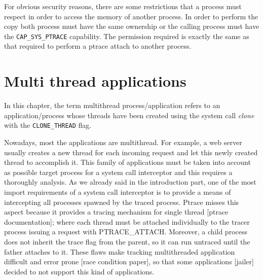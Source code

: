 For obvious security reasons, there are some restrictions that a process must respect in order to access the memory of another process. In order to perform the copy both process must have the same ownership or the calling process must have the \lstinline$CAP_SYS_PTRACE$ capability. The permission required is exactly the same as that required to perform a ptrace attach to another process. 






\section{Multi thread applications}
\label{multi_thread_application}

 In this chapter, the term multithread process/application refers to an application/process whose threads have been created using the system call \emph{clone} \cite{clone} with the \lstinline$CLONE_THREAD$ flag.
 
Nowadays, most the applications are multithread. For example, a web server usually creates a new thread for each incoming request and let this newly created thread to accomplish it. This family of applications must be taken into account as possible target process for a system call interceptor and this requires a thoroughly analysis. As we already said in the introduction part, one of the most import requirements of a system call interceptor is to provide a means of intercepting all processes spawned by the traced process. Ptrace misses this aspect because it provides a tracing mechanism for single thread [ptrace documentation]; where each thread must be attached individually to the tracer process issuing a request with PTRACE\_ATTACH. Moreover, a child process does not inherit the trace flag from the parent, so it can run untraced until the father attaches to it. These flaws make tracking multithreaded application difficult and error prone [race condition paper], so that some applications [jailer] decided to not support this kind of applications.

